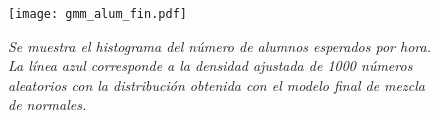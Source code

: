                                                                                                                                                                                                                                                                                                                                                                                                                                                                                 \begin{figure}[H]
                                                                                                                                                                                                                                                                                                                                                                                                                                                                                \centering
                                                                                                                                                                                                                                                                                                                                                                                                                                                                                \texttt{[image: gmm\_alum\_fin.pdf]} %
                                                                                                                                                                                                                                                                                                                                                                                                                                                                                \caption[\textit{Histograma del número de alumnos esperados por hora: Modelo final de mezcla de normales}]{\textit{Se muestra el histograma del número de alumnos esperados por hora. La línea azul corresponde a la densidad ajustada de 1000 números aleatorios con la distribución obtenida con el modelo final de mezcla de normales.}}\label{GMM_alum_fin}
                                                                                                                                                                                                                                                                                                                                                                                                                                                                                \end{figure}
                                                                                                                                                                                                                                                                                                                                                                                                                                                                                
